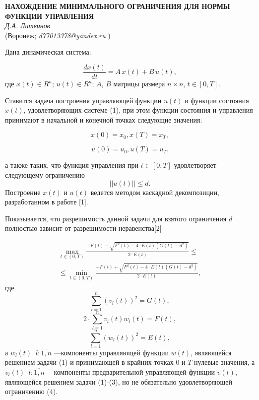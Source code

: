 \begin{center}{ \bf  НАХОЖДЕНИЕ МИНИМАЛЬНОГО ОГРАНИЧЕНИЯ ДЛЯ НОРМЫ ФУНКЦИИ УПРАВЛЕНИЯ}\\
{\it Д.А. Литвинов } \\
(Воронеж; {\it d77013378@yandex.ru} )
\end{center}


Дана  динамическая система:

\begin{equation}
\frac{dx(t)}{dt}=A\, x(t)+B\, u(t),
\end{equation}
где $x(t)\in R^{n}$;
$u(t)\in R^{n}$;
$A$, $B$ матрицы размера $n\times n
$,  $t\in [0,T]$.

Ставится задача построения  управляющей функции $u(t)$ и функции состояния $x(t)$, удовлетворяющих системе (1), при этом  функции состояния и управления  принимают в начальной и конечной точках следующие  значения:

\begin{equation}
x(0)=x_{0},x(T)=x_{T},
\end{equation}

\begin{equation}
u(0)=u_{0},u(T)=u_{T}.
\end{equation}

а также таких, что функция управления при $t\in [0,T]$ удовлетворяет следующему ограничению
\begin{equation}
||u(t)||\leq d.
\end{equation}
 Построение $x(t)$ и $u(t)$ ведется методом каскадной декомпозиции, разработанном в работе [1].

Показывается, что разрешимость данной задачи для взятого ограничения $d$ полностью зависит от разрешимости  неравенства[2]

\begin{multline}
\max\limits_{t\in(0,T)}\frac{-F(t)-\sqrt{F^{2}(t)-4\cdot E(t)(G(t)-d^{2})}}{2\cdot E(t)}
\leq
\\ \leq
\min\limits_{t\in(0,T)}\frac{-F(t)+\sqrt{F^{2}(t)-4\cdot E(t)(G(t)-d^{2})}}{2\cdot E(t)},
\end{multline}
где $$\sum\limits_{l=1}^{n}(v_{l}(t))^{2}=G(t),$$
$$2\cdot\sum\limits_{l=1}^{n}v_{l}(t)w_{l}(t)=F(t),$$
$$\sum\limits_{l=1}^{n}(w_{l}(t))^{2}=E(t),$$
а $w_{l}(t)\;\;l:\overline{1,n}$ ---компоненты управляющей  функции $w(t)$, являющейся решением задачи (1) и принимающей в крайних точках 0 и $T$ нулевые значения, а $v_{l}(t)\;\;l:\overline{1,n}$ ---компоненты предварительной управляющей  функции $v(t)$, являющейся решением задачи (1)-(3), но не обязательно удовлетворяющей ограничению (4).


